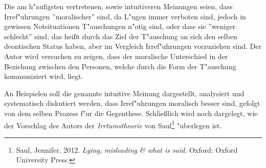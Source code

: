 \documentclass[a4paper]{article}
\begin{document}
Die am h"aufigsten vertretenen, sowie intuitiveren Meinungen seien, dass Irref"uhrungen ''moralischer'' sind, da L"ugen immer verboten sind, jedoch in gewissen Notsituationen T"auschungen n"otig sind, oder dass sie ''weniger schlecht'' sind, das hei\ss t durch das Ziel der T"auschung an sich den selben deontischen Status haben, aber im Vergleich Irref"uhrungen vorzuziehen sind.
Der Autor wird versuchen zu zeigen, dass der moralische Unterschied in der Beziehung zwischen den Personen, welche durch die Form der T"auschung kommuniziert wird, liegt. 

An Beispielen soll die genannte intuitive Meinung dargestellt, analysiert und systematisch diskutiert werden, dass Irref"uhrungen moralisch besser sind, gefolgt von dem selben Prozess f"ur die Gegenthese. Schlie\ss lich wird noch dargelegt, wie der Vorschlag des Autors der \emph{Irrtumstheorie} von Saul\footnote{Saul, Jennifer. 2012. \emph{Lying, misleading \& what is said}. Oxford: Oxford University Press.} "uberlegen ist.


\newpage

\end{document}
